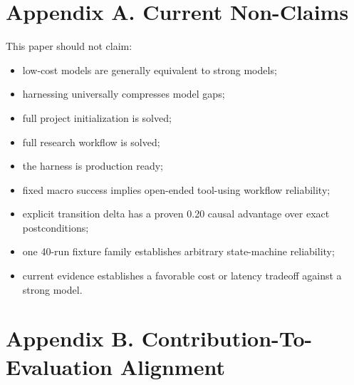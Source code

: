 \documentclass[11pt]{article}
\begin{document}
\section{Appendix A. Current Non-Claims}

This paper should not claim:

\begin{itemize}
\item low-cost models are generally equivalent to strong models;
\item harnessing universally compresses model gaps;
\item full project initialization is solved;
\item full research workflow is solved;
\item the harness is production ready;
\item fixed macro success implies open-ended tool-using workflow reliability;
\item explicit transition delta has a proven 0.20 causal advantage over exact postconditions;
\item one 40-run fixture family establishes arbitrary state-machine reliability;
\item current evidence establishes a favorable cost or latency tradeoff against a strong model.
\end{itemize}

\section{Appendix B. Contribution-To-Evaluation Alignment}
\end{document}
